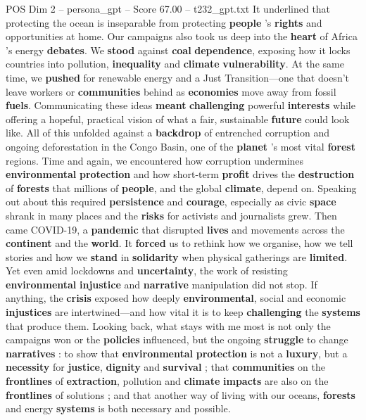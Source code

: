 \begin{textsample}{POS Dim 2 – persona\_gpt – Score 67.00 – t232\_gpt.txt}
It underlined that protecting the ocean is inseparable from protecting \textbf{people} ’s \textbf{rights} and opportunities at home.
Our campaigns also took us deep into the \textbf{heart} of Africa ’s energy \textbf{debates}.
We \textbf{stood} against \textbf{coal} \textbf{dependence}, exposing how it locks countries into pollution, \textbf{inequality} and \textbf{climate} \textbf{vulnerability}.
At the same time, we \textbf{pushed} for renewable energy and a Just Transition—one that doesn't leave workers or \textbf{communities} behind as \textbf{economies} move away from fossil \textbf{fuels}.
Communicating these ideas \textbf{meant} \textbf{challenging} powerful \textbf{interests} while offering a hopeful, practical vision of what a fair, sustainable \textbf{future} could look like.
All of this unfolded against a \textbf{backdrop} of entrenched corruption and ongoing deforestation in the Congo Basin, one of the \textbf{planet} ’s most vital \textbf{forest} regions.
Time and again, we encountered how corruption undermines \textbf{environmental} \textbf{protection} and how short-term \textbf{profit} drives the \textbf{destruction} of \textbf{forests} that millions of \textbf{people}, and the global \textbf{climate}, depend on.
Speaking out about this required \textbf{persistence} and \textbf{courage}, especially as civic \textbf{space} shrank in many places and the \textbf{risks} for activists and journalists grew.
Then came COVID-19, a \textbf{pandemic} that disrupted \textbf{lives} and movements across the \textbf{continent} and the \textbf{world}.
It \textbf{forced} us to rethink how we organise, how we tell stories and how we \textbf{stand} in \textbf{solidarity} when physical gatherings are \textbf{limited}.
Yet even amid lockdowns and \textbf{uncertainty}, the work of resisting \textbf{environmental} \textbf{injustice} and \textbf{narrative} manipulation did not stop.
If anything, the \textbf{crisis} exposed how deeply \textbf{environmental}, social and economic \textbf{injustices} are intertwined—and how vital it is to keep \textbf{challenging} the \textbf{systems} that produce them.
Looking back, what stays with me most is not only the campaigns won or the \textbf{policies} influenced, but the ongoing \textbf{struggle} to change \textbf{narratives} : to show that \textbf{environmental} \textbf{protection} is not a \textbf{luxury}, but a \textbf{necessity} for \textbf{justice}, \textbf{dignity} and \textbf{survival} ; that \textbf{communities} on the \textbf{frontlines} of \textbf{extraction}, pollution and \textbf{climate} \textbf{impacts} are also on the \textbf{frontlines} of solutions ; and that another way of living with our oceans, \textbf{forests} and energy \textbf{systems} is both necessary and possible.

\end{textsample}
